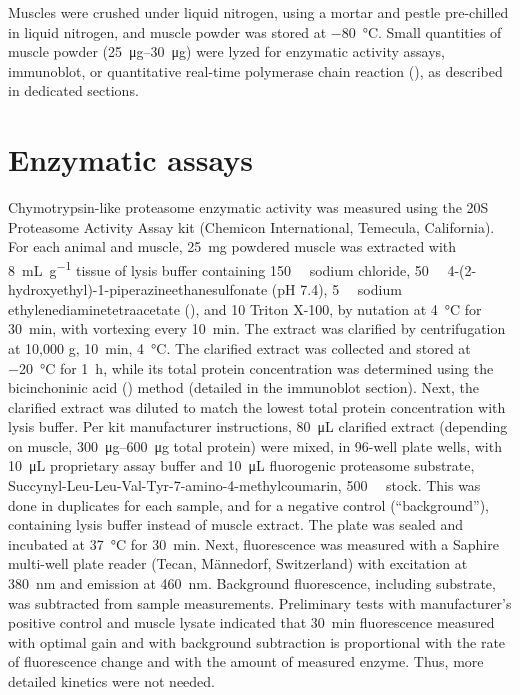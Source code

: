 \documentclass[12pt,english]{report}\usepackage[]{graphicx}\usepackage[]{color}
\begin{document}
Muscles were crushed under liquid nitrogen, using a mortar and pestle
pre-chilled in liquid nitrogen, and muscle powder was stored at \SI{-80}{\celsius}.
Small quantities of muscle powder (\SIrange{25}{30}{\micro\gram})
were lyzed for enzymatic activity assays, immunoblot, or quantitative
real-time polymerase chain reaction (),
as described in dedicated sections.


\section{Enzymatic assays}

Chymotrypsin-like proteasome enzymatic activity was measured using
the 20S Proteasome Activity Assay kit (Chemicon International, Temecula,
California). For each animal and muscle, \SI{25}{\milli\gram} powdered
muscle was extracted with \SI{8}{\milli\liter\per\gram} tissue of
lysis buffer containing \SI{150}{\milli\molar} sodium chloride, \SI{50}{\milli\molar}
4-(2-hydroxyethyl)-1-piperazineethanesulfonate 
(pH 7.4), \SI{5}{\milli\molar} sodium ethylenediaminetetraacetate
(), and \SI{10}{\promille}
Triton X-100, by nutation at \SI{4}{\celsius} for \SI{30}{\minute},
with vortexing every \SI{10}{\minute}. The extract was clarified
by centrifugation at 10,000 g, \SI{10}{\minute}, \SI{4}{\celsius}.
The clarified extract was collected and stored at \SI{-20}{\celsius}
for \SI{1}{\hour}, while its total protein concentration was determined
using the bicinchoninic acid ()
method (detailed in the immunoblot section). Next, the clarified extract
was diluted to match the lowest total protein concentration with lysis
buffer. Per kit manufacturer instructions, \SI{80}{\micro\liter}
clarified extract (depending on muscle, \SIrange{300}{600}{\micro\gram}
total protein) were mixed, in 96-well plate wells, with \SI{10}{\micro\liter}
proprietary assay buffer and \SI{10}{\micro\liter} fluorogenic proteasome
substrate, Succynyl-Leu-Leu-Val-Tyr-7-amino-4-methylcoumarin, \SI{500}{\micro\molar}
stock. This was done in duplicates for each sample, and for a negative
control (``background''), containing lysis buffer instead of muscle
extract. The plate was sealed and incubated at \SI{37}{\celsius}
for \SI{30}{\minute}. Next, fluorescence was measured with a Saphire
multi-well plate reader (Tecan, Männedorf, Switzerland) with excitation
at \SI{380}{\nano\meter} and emission at \SI{460}{\nano\meter}.
Background fluorescence, including substrate, was subtracted from
sample measurements. Preliminary tests with manufacturer's positive
control and muscle lysate indicated that \SI{30}{\minute} fluorescence
measured with optimal gain and with background subtraction is proportional
with the rate of fluorescence change and with the amount of measured
enzyme. Thus, more detailed kinetics were not needed.
\end{document}
